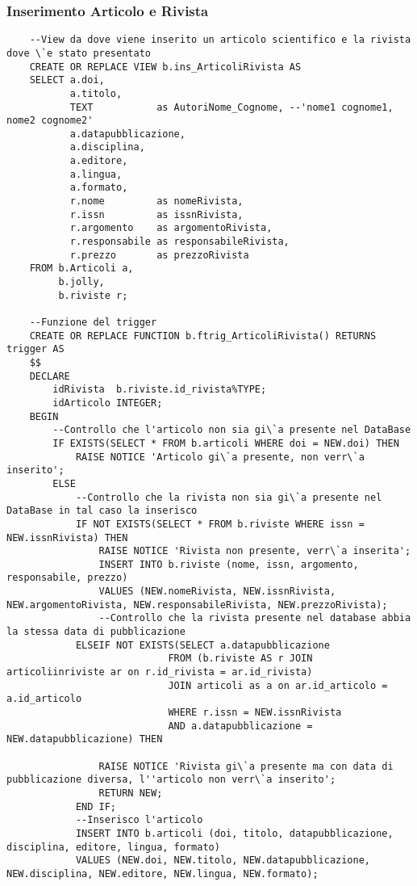 \subsubsection{Inserimento Articolo e Rivista}
\begin{lstlisting}
    --View da dove viene inserito un articolo scientifico e la rivista dove \`e stato presentato
    CREATE OR REPLACE VIEW b.ins_ArticoliRivista AS
    SELECT a.doi,
           a.titolo,
           TEXT           as AutoriNome_Cognome, --'nome1 cognome1, nome2 cognome2'
           a.datapubblicazione,
           a.disciplina,
           a.editore,
           a.lingua,
           a.formato,
           r.nome         as nomeRivista,
           r.issn         as issnRivista,
           r.argomento    as argomentoRivista,
           r.responsabile as responsabileRivista,
           r.prezzo       as prezzoRivista
    FROM b.Articoli a,
         b.jolly,
         b.riviste r;
    
    --Funzione del trigger
    CREATE OR REPLACE FUNCTION b.ftrig_ArticoliRivista() RETURNS trigger AS
    $$
    DECLARE
        idRivista  b.riviste.id_rivista%TYPE;
        idArticolo INTEGER;
    BEGIN
        --Controllo che l'articolo non sia gi\`a presente nel DataBase
        IF EXISTS(SELECT * FROM b.articoli WHERE doi = NEW.doi) THEN
            RAISE NOTICE 'Articolo gi\`a presente, non verr\`a inserito';
        ELSE
            --Controllo che la rivista non sia gi\`a presente nel DataBase in tal caso la inserisco
            IF NOT EXISTS(SELECT * FROM b.riviste WHERE issn = NEW.issnRivista) THEN
                RAISE NOTICE 'Rivista non presente, verr\`a inserita';
                INSERT INTO b.riviste (nome, issn, argomento, responsabile, prezzo)
                VALUES (NEW.nomeRivista, NEW.issnRivista, NEW.argomentoRivista, NEW.responsabileRivista, NEW.prezzoRivista);
                --Controllo che la rivista presente nel database abbia la stessa data di pubblicazione
            ELSEIF NOT EXISTS(SELECT a.datapubblicazione
                            FROM (b.riviste AS r JOIN articoliinriviste ar on r.id_rivista = ar.id_rivista)
                            JOIN articoli as a on ar.id_articolo = a.id_articolo
                            WHERE r.issn = NEW.issnRivista
                            AND a.datapubblicazione = NEW.datapubblicazione) THEN

                RAISE NOTICE 'Rivista gi\`a presente ma con data di pubblicazione diversa, l''articolo non verr\`a inserito';
                RETURN NEW;
            END IF;
            --Inserisco l'articolo
            INSERT INTO b.articoli (doi, titolo, datapubblicazione, disciplina, editore, lingua, formato)
            VALUES (NEW.doi, NEW.titolo, NEW.datapubblicazione, NEW.disciplina, NEW.editore, NEW.lingua, NEW.formato);
    

\end{lstlisting}
